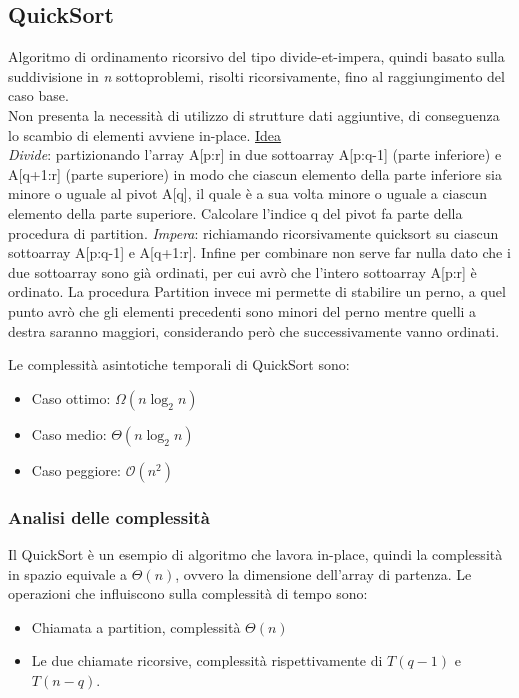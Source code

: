 \documentclass[a4paper, 11pt]{article}
\begin{document}
\subsection{QuickSort}
Algoritmo di ordinamento ricorsivo del tipo divide-et-impera, quindi basato sulla suddivisione in \textit{n} sottoproblemi, risolti ricorsivamente, fino al raggiungimento del caso base.\\
Non presenta la necessità di utilizzo di strutture dati aggiuntive, di conseguenza lo scambio di elementi avviene in-place.\bigbreak
\noindent  \underline{Idea} \\ \textit{Divide}: partizionando l'array A[p:r] in due sottoarray A[p:q-1] (parte inferiore) e A[q+1:r] (parte superiore) in modo che ciascun elemento della parte 
inferiore sia minore o uguale al pivot A[q], il quale è a sua volta minore o uguale a ciascun elemento della parte superiore. Calcolare l'indice q del pivot fa parte della procedura 
di partition.\bigbreak
\noindent \textit{Impera}: richiamando ricorsivamente quicksort su ciascun sottoarray A[p:q-1] e A[q+1:r]. Infine per combinare non serve far 
nulla dato che i due sottoarray sono già ordinati, per cui avrò che l'intero sottoarray A[p:r] è ordinato. 
La procedura Partition invece mi permette di stabilire un perno, a quel punto avrò che gli elementi precedenti sono minori del perno mentre quelli a destra saranno maggiori,
considerando però che successivamente vanno ordinati.\bigskip

\noindent Le complessità asintotiche temporali di QuickSort sono: 
\begin{itemize}
    \item Caso ottimo: $\Omega(n\log_2n)$
    \item Caso medio: $\Theta(n\log_2n)$
    \item Caso peggiore: $\mathcal{O}(n^2)$
\end{itemize}

\subsubsection{Analisi delle complessità}
Il QuickSort è un esempio di algoritmo che lavora in-place, quindi la complessità in spazio equivale a $\Theta(n)$, ovvero la dimensione dell'array di partenza.\bigbreak
\noindent Le operazioni che influiscono sulla complessità di tempo sono:
\begin{itemize}
    \item Chiamata a partition, complessità $\Theta(n)$
    \item Le due chiamate ricorsive, complessità rispettivamente di $T(q-1)$ e $T(n-q)$.
\end{itemize}
\end{document}
